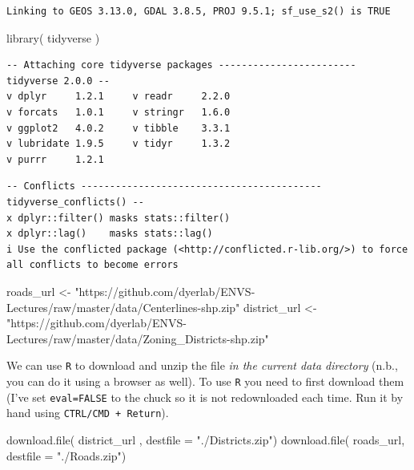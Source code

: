 \documentclass[
  letterpaper,
]{book}
\newenvironment{Shaded}{\begin{snugshade}}{\end{snugshade}}
\newcommand{\AttributeTok}[1]{\textcolor[rgb]{0.40,0.45,0.13}{#1}}
\newcommand{\FunctionTok}[1]{\textcolor[rgb]{0.28,0.35,0.67}{#1}}
\newcommand{\NormalTok}[1]{\textcolor[rgb]{0.00,0.23,0.31}{#1}}
\newcommand{\OtherTok}[1]{\textcolor[rgb]{0.00,0.23,0.31}{#1}}
\newcommand{\StringTok}[1]{\textcolor[rgb]{0.13,0.47,0.30}{#1}}
\begin{document}
\begin{verbatim}
Linking to GEOS 3.13.0, GDAL 3.8.5, PROJ 9.5.1; sf_use_s2() is TRUE
\end{verbatim}

\begin{Shaded}
\begin{Highlighting}[]
\FunctionTok{library}\NormalTok{( tidyverse )}
\end{Highlighting}
\end{Shaded}

\begin{verbatim}
-- Attaching core tidyverse packages ------------------------ tidyverse 2.0.0 --
v dplyr     1.2.1     v readr     2.2.0
v forcats   1.0.1     v stringr   1.6.0
v ggplot2   4.0.2     v tibble    3.3.1
v lubridate 1.9.5     v tidyr     1.3.2
v purrr     1.2.1     
\end{verbatim}

\begin{verbatim}
-- Conflicts ------------------------------------------ tidyverse_conflicts() --
x dplyr::filter() masks stats::filter()
x dplyr::lag()    masks stats::lag()
i Use the conflicted package (<http://conflicted.r-lib.org/>) to force all conflicts to become errors
\end{verbatim}

\begin{Shaded}
\begin{Highlighting}[]
\NormalTok{roads\_url }\OtherTok{\textless{}{-}} \StringTok{"https://github.com/dyerlab/ENVS{-}Lectures/raw/master/data/Centerlines{-}shp.zip"}
\NormalTok{district\_url }\OtherTok{\textless{}{-}} \StringTok{"https://github.com/dyerlab/ENVS{-}Lectures/raw/master/data/Zoning\_Districts{-}shp.zip"}
\end{Highlighting}
\end{Shaded}

We can use \texttt{R} to download and unzip the file \emph{in the
current data directory} (n.b., you can do it using a browser as well).
To use \texttt{R} you need to first download them (I've set
\texttt{eval=FALSE} to the chuck so it is not redownloaded each time.
Run it by hand using \texttt{CTRL/CMD\ +\ Return}).

\begin{Shaded}
\begin{Highlighting}[]
\FunctionTok{download.file}\NormalTok{( district\_url , }\AttributeTok{destfile =} \StringTok{"./Districts.zip"}\NormalTok{)}
\FunctionTok{download.file}\NormalTok{( roads\_url, }\AttributeTok{destfile =}  \StringTok{"./Roads.zip"}\NormalTok{)}
\end{Highlighting}
\end{Shaded}
\end{document}
